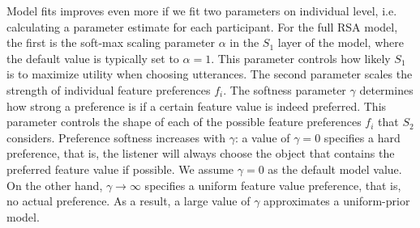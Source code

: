 \documentclass[10pt,a4paper]{article}
\newcommand{\gcs}[1]{\textcolor{blue}{[gcs: #1]}}
\begin{document}
Model fits improves even more if we fit two parameters on individual level, i.e. calculating a parameter estimate for each participant.
For the full RSA model, the first is the soft-max scaling parameter $\alpha$ in the $S_1$ layer of the model, where the default value is typically set to $\alpha=1$. 
This parameter controls how likely $S_1$ is to maximize utility when choosing utterances. The second parameter scales the strength of individual feature preferences $f_i$. 
The softness parameter $\gamma$ determines how strong a preference is if a certain feature value is indeed preferred.
This parameter controls the shape of each of the possible feature preferences $f_i$ that $S_2$ considers. 
Preference softness increases with $\gamma$: 
a value of $\gamma=0$ specifies a hard preference, that is, the listener will always choose the object that contains the preferred feature value if possible. 
We assume $\gamma=0$ as the default model value. 
On the other hand, $\gamma \rightarrow \infty$ specifies a uniform feature value preference, that is, no actual preference.
As a result, a large value of $\gamma$ approximates a uniform-prior model. %

\end{document}
